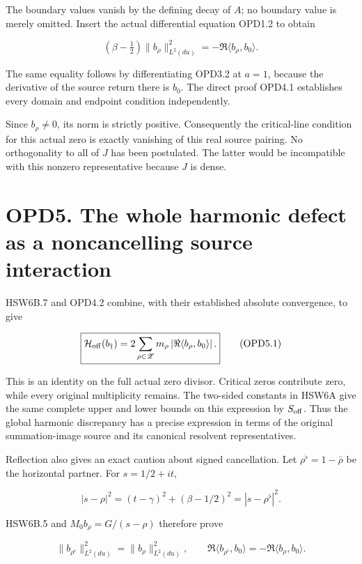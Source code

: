 The boundary values vanish by the defining decay of \(A\); no boundary
value is merely omitted. Insert the actual differential equation OPD1.2
to obtain

\[
\boxed{(\beta-\tfrac12)\|b_\rho\|_{L^2(du)}^2
=-\Re\langle b_\rho,b_0\rangle.}
\tag{OPD4.2}
\]

The same equality follows by differentiating OPD3.2 at \(a=1\), because
the derivative of the source return there is \(b_0\). The direct proof
OPD4.1 establishes every domain and endpoint condition independently.

Since \(b_\rho\ne0\), its norm is strictly positive. Consequently the
critical-line condition for this actual zero is exactly vanishing of
this real source pairing. No orthogonality to all of \(J\) has been
postulated. The latter would be incompatible with this nonzero
representative because \(J\) is dense.

\section{OPD5. The whole harmonic defect as a noncancelling source
interaction}\label{opd5.-the-whole-harmonic-defect-as-a-noncancelling-source-interaction}

HSW6B.7 and OPD4.2 combine, with their established absolute convergence,
to give

\[
\boxed{
\mathcal H_{\rm off}(b_\dagger)
=2\sum_{\rho\in\mathscr Z}m_\rho
 \left|\Re\langle b_\rho,b_0\rangle\right|.}
\tag{OPD5.1}
\]

This is an identity on the full actual zero divisor. Critical zeros
contribute zero, while every original multiplicity remains. The
two-sided constants in HSW6A give the same complete upper and lower
bounds on this expression by \(S_{\rm off}\). Thus the global harmonic
discrepancy has a precise expression in terms of the original
summation-image source and its canonical resolvent representatives.

Reflection also gives an exact caution about signed cancellation. Let
\(\rho^\flat=1-\bar\rho\) be the horizontal partner. For \(s=1/2+it\),

\[
|s-\rho|^2=(t-\gamma)^2+(\beta-1/2)^2
=|s-\rho^\flat|^2.
\]

HSW6B.5 and \(M_0b_\rho=G/(s-\rho)\) therefore prove

\[
\|b_{\rho^\flat}\|_{L^2(du)}^2=\|b_\rho\|_{L^2(du)}^2,
\qquad
\Re\langle b_{\rho^\flat},b_0\rangle
=-\Re\langle b_\rho,b_0\rangle.
\tag{OPD5.2}
\]

